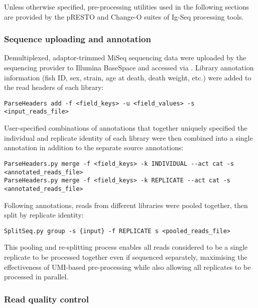 Unless otherwise specified, pre-processing utilities used in the following sections are provided by the pRESTO \parencite{vanderheiden2014presto} and Change-O \parencite{gupta2015changeo} suites of Ig-Seq processing tools.

\subsubsection{Sequence uploading and annotation}
\label{sec:methods_comp_igpreproc_annot}

Demultiplexed, adaptor-trimmed MiSeq sequencing data were uploaded by the sequencing provider to Illumina BaseSpace and accessed via . Library annotation information (fish ID, sex, strain, age at death, death weight, etc.) were added to the read headers of each library:

\begin{lstlisting}
ParseHeaders add -f <field_keys> -u <field_values> -s <input_reads_file>
\end{lstlisting}

User-specified combinations of annotations that together uniquely specified the individual and replicate identity of each library were then combined into a single annotation in addition to the separate source annotations:

\begin{lstlisting}
ParseHeaders.py merge -f <field_keys> -k INDIVIDUAL --act cat -s <annotated_reads_file>
ParseHeaders.py merge -f <field_keys> -k REPLICATE --act cat -s <annotated_reads_file>
\end{lstlisting}

Following annotations, reads from different libraries were pooled together, then split by replicate identity:

\begin{lstlisting}
SplitSeq.py group -s {input} -f REPLICATE s <pooled_reads_file>
\end{lstlisting}

This pooling and re-splitting process enables all reads considered to be a single replicate to be processed together even if sequenced separately, maximising the effectiveness of UMI-based pre-processing while also allowing all replicates to be processed in parallel.

\subsubsection{Read quality control}
\label{sec:methods_comp_igpreproc_filter}


